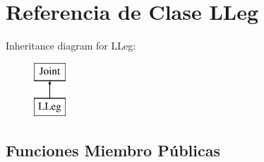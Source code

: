 \hypertarget{class_l_leg}{\section{\-Referencia de \-Clase \-L\-Leg}
\label{class_l_leg}
}
\-Inheritance diagram for \-L\-Leg\-:\begin{figure}[H]
\begin{center}
\leavevmode
\includegraphics[height=2.000000cm]{class_l_leg}
\end{center}
\end{figure}
\subsection*{\-Funciones \-Miembro \-Públicas}
